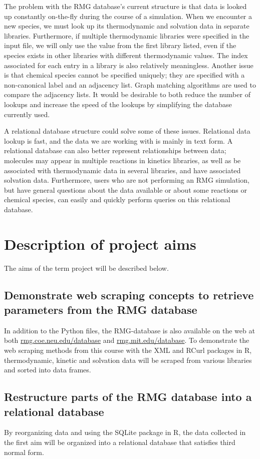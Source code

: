 \documentclass[11pt]{article}
\begin{document}
The problem with the RMG database's current structure is that data is looked up constantly on-the-fly during the course of a simulation. When we encounter a new species, we must look up its thermodynamic and solvation data in separate libraries. Furthermore, if multiple thermodynamic libraries were specified in the input file, we will only use the value from the first library listed, even if the species exists in other libraries with different thermodynamic values. The index associated for each entry in a library is also relatively meaningless. Another issue is that chemical species cannot be specified uniquely; they are specified with a non-canonical label and an adjacency list. Graph matching algorithms are used to compare the adjacency lists. It would be desirable to both reduce the number of lookups and increase the speed of the lookups by simplifying the database currently used.

A relational database structure could solve some of these issues. Relational data lookup is fast, and the data we are working with is mainly in text form. A relational database can also better represent relationships between data; molecules may appear in multiple reactions in kinetics libraries, as well as be associated with thermodynamic data in several libraries, and have associated solvation data. Furthermore, users who are not performing an RMG simulation, but have general questions about the data available or about some reactions or chemical species, can easily and quickly perform queries on this relational database.

\section{Description of project aims}
The aims of the term project will be described below.
\subsection{Demonstrate web scraping concepts to retrieve parameters  from the RMG database}
In addition to the Python files, the RMG-database is also available on the web at both \url{rmg.coe.neu.edu/database} and \url{rmg.mit.edu/database}. To demonstrate the web scraping methods from this course with the XML and RCurl packages in R, thermodynamic, kinetic and solvation data will be scraped from various libraries and sorted into data frames.
\subsection{Restructure parts of the RMG database into a relational database}
By reorganizing data and using the SQLite package in R, the data collected in the first aim will be organized into a relational database that satisfies third normal form.
\end{document}
